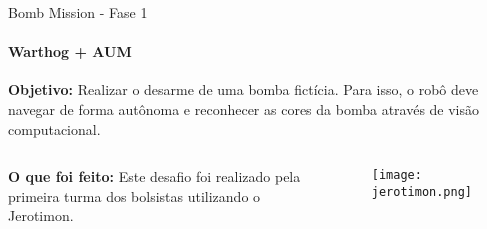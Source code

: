 \begin{frame}[t]{Bomb Mission - Fase 1} 
    \framesubtitle{Warthog + AUM}

    \textbf{Objetivo:} Realizar o desarme de uma bomba fictícia. Para isso, o robô deve navegar de forma autônoma e reconhecer as cores da bomba através de visão computacional.

    \vspace*{0.3cm}
        \begin{columns}[t]
            \vspace*{0.8cm}

            \textbf{O que foi feito:} 
             Este desafio foi realizado pela primeira 
             turma dos bolsistas utilizando o Jerotimon.
            \begin{center}
                \begin{figure}
                    \texttt{[image: jerotimon.png]}
                \end{figure}
            \end{center}
        \end{columns}
\end{frame}
